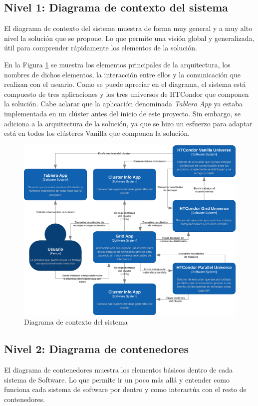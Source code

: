 \subsection{Nivel 1: Diagrama de contexto del sistema}
\noindent
El diagrama de contexto del sistema muestra de forma muy general y a muy alto nivel la solución que se propone. Lo que permite una visión global y generalizada, útil para comprender rápidamente los elementos de la solución.

En la Figura \ref{fig:C4Nivel1} se muestra los elementos principales de la arquitectura, los nombres de dichos elementos, la interacción entre ellos y la comunicación que realizan con el usuario. Como se puede apreciar en el diagrama, el sistema está compuesto de tres aplicaciones y los tres universos de HTCondor que componen la solución. Cabe aclarar que la aplicación denominada \textit{Tablero App} ya estaba implementada en un clúster antes del inicio de este proyecto. Sin embargo, se adiciona a la arquitectura de la solución, ya que se hizo un esfuerzo para adaptar está en todos los clústeres Vanilla que componen la solución.

\begin{figure}[H]
	\centering
	\includegraphics[scale=0.1]{tablas-images/C4/Diagramas HTCondor-Nivel 1.drawio.png}
	\caption{Diagrama de contexto del sistema}
    \label{fig:C4Nivel1}
\end{figure}

\subsection{Nivel 2: Diagrama de contenedores}
\noindent
El diagrama de contenedores muestra los elementos básicos dentro de cada sistema de Software. Lo que permite ir un poco más allá y entender como funciona cada sistema de software por dentro y como interactúa con el resto de contenedores.

